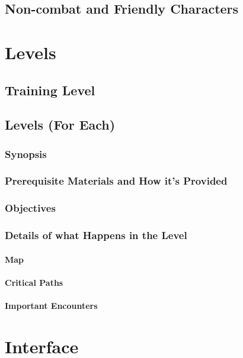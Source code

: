 \documentclass[12pt]{article}
\begin{document}
\subsection{Non-combat and Friendly Characters}

\section{Levels}

\subsection{Training Level}

\subsection{Levels (For Each)}

\subsubsection{Synopsis}

\subsubsection{Prerequisite Materials and How it's Provided}

\subsubsection{Objectives}

\subsubsection{Details of what Happens in the Level}

\paragraph{Map}

\paragraph{Critical Paths}

\paragraph{Important Encounters}

\section{Interface}
\end{document}
